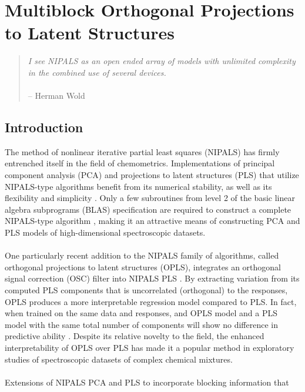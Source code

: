 
\chapter{Multiblock Orthogonal Projections to Latent Structures}

\begin{quote}
{\it
  I see NIPALS as an open ended array of models with unlimited complexity
  in the combined use of several devices.}
\\\\
 -- Herman Wold
\end{quote}

\section{Introduction}

\begin{doublespace}
The method of nonlinear iterative partial least squares (NIPALS) has firmly
entrenched itself in the field of chemometrics. Implementations of principal
component analysis (PCA) and projections to latent structures (PLS) that
utilize NIPALS-type algorithms benefit from its numerical stability, as well
as its flexibility and simplicity
\cite{andersson:jchemo2009,hoskuldsson:jchemo1988,wold:cils2001}.
Only a few subroutines from level 2 of the basic linear algebra subprograms
(BLAS) specification are required to construct a complete NIPALS-type
algorithm \cite{golub2012}, making it an attractive means of constructing
PCA and PLS models of high-dimensional spectroscopic datasets.
\\\\
One particularly recent addition to the NIPALS family of algorithms, called
orthogonal projections to latent structures (OPLS), integrates an orthogonal
signal correction (OSC) filter into NIPALS PLS
\cite{trygg:jchemo2002,boulet:cils2012}. By extracting variation from its
computed PLS components that is uncorrelated (orthogonal) to the responses,
OPLS produces a more interpretable regression model compared to PLS. In fact,
when trained on the same data and responses, and OPLS model and a PLS model
with the same total number of components will show no difference in predictive
ability \cite{verron:jchemo2004}. Despite its relative novelty to the field,
the enhanced interpretability of OPLS over PLS has made it a popular method
in exploratory studies of spectroscopic datasets of complex chemical mixtures.
\\\\
Extensions of NIPALS PCA and PLS to incorporate blocking information that

\end{doublespace}
